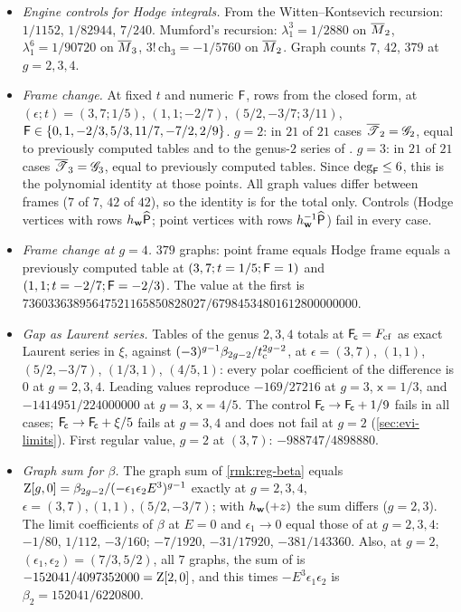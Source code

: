\begin{itemize}
\item \emph{Engine controls for Hodge integrals.} From the Witten--Kontsevich recursion: $1/1152$, $1/82944$, $7/240$. Mumford's recursion: $\lambda_1^3=1/2880$ on $\overline{M}_2$, $\lambda_1^6=1/90720$ on $\overline{M}_3$, $3!\,\mathrm{ch}_3=-1/5760$ on $\overline{M}_2$. Graph counts $7$, $42$, $379$ at $g=2,3,4$.
\item \emph{Frame change.} At fixed $t$ and numeric $\mathsf{F}$, rows from the closed form, at $(\epsilon;t)=(3,7;1/5)$, $(1,1;-2/7)$, $(5/2,-3/7;3/11)$, $\mathsf{F}\in\{0,1,-2/3,5/3,11/7,-7/2,2/9\}$. $g=2$: in $21$ of $21$ cases $\overline{\mathscr{T}}_2=\mathscr{G}_2$, equal to previously computed tables and to the genus-$2$ series of \cite{BS}. $g=3$: in $21$ of $21$ cases $\overline{\mathscr{T}}_3=\mathscr{G}_3$, equal to previously computed tables. Since $\deg_{\mathsf{F}}\leq 6$, this is the polynomial identity at those points. All graph values differ between frames ($7$ of $7$, $42$ of $42$), so the identity is for the total only. Controls (Hodge vertices with rows $h_{\mathbf{w}}\widehat{\mathsf{P}}$; point vertices with rows $h_{\mathbf{w}}^{-1}\widehat{\mathsf{P}}$) fail in every case.
\item \emph{Frame change at $g=4$.} $379$ graphs: point frame equals Hodge frame equals a previously computed table at $(3,7;t=1/5;\mathsf{F}=1)$ and $(1,1;t=-2/7;\mathsf{F}=-2/3)$. The value at the first is $73603363895647521165850828027/67984534801612800000000$.
\item \emph{Gap as Laurent series.} Tables of the genus $2,3,4$ totals at $\mathsf{F}_{\!\mathsf{c}}=F_{\mathrm{cf}}$ as exact Laurent series in $\xi$, against $(-3)^{g-1}\beta_{2g-2}/t_{\mathrm{c}}^{2g-2}$, at $\epsilon=(3,7)$, $(1,1)$, $(5/2,-3/7)$, $(1/3,1)$, $(4/5,1)$: every polar coefficient of the difference is $0$ at $g=2,3,4$. Leading values reproduce $-169/27216$ at $g=3$, $\mathsf{x}=1/3$, and $-1414951/224000000$ at $g=3$, $\mathsf{x}=4/5$. The control $\mathsf{F}_{\!\mathsf{c}}\to\mathsf{F}_{\!\mathsf{c}}+1/9$ fails in all cases; $\mathsf{F}_{\!\mathsf{c}}\to\mathsf{F}_{\!\mathsf{c}}+\xi/5$ fails at $g=3,4$ and does not fail at $g=2$ (\cref{sec:evi-limits}). First regular value, $g=2$ at $(3,7)$: $-988747/4898880$.
\item \emph{Graph sum for $\beta$.} The graph sum of \cref{rmk:reg-beta} equals $\mathrm{Z}[g,0]=\beta_{2g-2}/(-\epsilon_1\epsilon_2E^3)^{g-1}$ exactly at $g=2,3,4$, $\epsilon=(3,7),(1,1),(5/2,-3/7)$; with $h_{\mathbf{w}}(+z)$ the sum differs ($g=2,3$). The limit coefficients of $\beta$ at $E=0$ and $\epsilon_1\to0$ equal those of \cite{BS} at $g=2,3,4$: $-1/80$, $1/112$, $-3/160$; $-7/1920$, $-31/17920$, $-381/143360$. Also, at $g=2$, $(\epsilon_1,\epsilon_2)=(7/3,5/2)$, all $7$ graphs, the sum of \cite{BS} is $-152041/4097352000=\mathrm{Z}[2,0]$, and this times $-E^3\epsilon_1\epsilon_2$ is $\beta_2=152041/6220800$.

\end{itemize}
